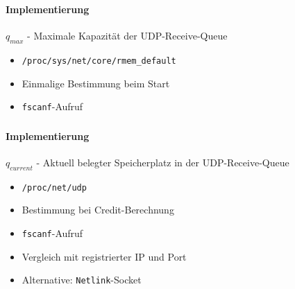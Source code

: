 \documentclass{beamer}
\begin{document}

    \begin{frame}[containsverbatim]
        \frametitle{\mytitle}
        \framesubtitle{Implementierung}
        $q_{max}$ - Maximale Kapazität der UDP-Receive-Queue
        \vspace{10pt}\par
        \begin{itemize}
            \item \texttt{/proc/sys/net/core/rmem\_default}
            \item Einmalige Bestimmung beim Start
            \item \texttt{fscanf}-Aufruf
        \end{itemize}
        \vspace{20pt}\par
		
    \end{frame}

    \begin{frame}[containsverbatim]
        \frametitle{\mytitle}
        \framesubtitle{Implementierung}
        $q_{current}$ - Aktuell belegter Speicherplatz in der UDP-Receive-Queue
        \vspace{10pt}\par
        \begin{itemize}
            \item \texttt{/proc/net/udp}
            \item Bestimmung bei Credit-Berechnung
            \item \texttt{fscanf}-Aufruf
            \item Vergleich mit registrierter IP und Port
            \item Alternative: \texttt{Netlink}-Socket
        \end{itemize}
        \vspace{20pt}\par
		
    \end{frame}
\end{document}
